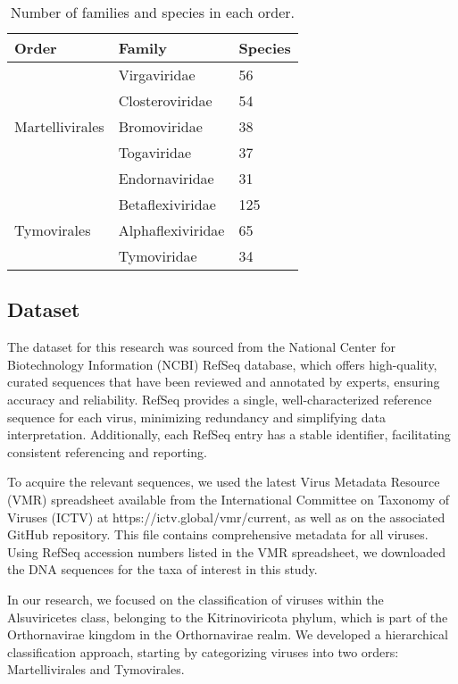 \begin{table}[tb]
\centering
\begin{tabular}{| l | l | l |}
\hline
\textbf{Order} & \textbf{Family} & \textbf{Species} \\
\hline
\multirow{5}{*}{Martellivirales} & Virgaviridae & 56 \\
                                  & Closteroviridae & 54 \\
                                  & Bromoviridae & 38 \\
                                  & Togaviridae & 37 \\
                                  & Endornaviridae & 31 \\
\hline
\multirow{3}{*}{Tymovirales}     & Betaflexiviridae & 125 \\
                                  & Alphaflexiviridae & 65 \\
                                  & Tymoviridae & 34 \\
\hline
\end{tabular}
\caption{Number of families and species in each order.}
\label{table:species:counts}
\end{table}


\subsection{Dataset}
\label{sec:obj:det}

The dataset for this research was sourced from the National Center for Biotechnology Information (NCBI) RefSeq database, which offers high-quality, curated sequences that have been reviewed and annotated by experts, ensuring accuracy and reliability. RefSeq provides a single, well-characterized reference sequence for each virus, minimizing redundancy and simplifying data interpretation. Additionally, each RefSeq entry has a stable identifier, facilitating consistent referencing and reporting.

To acquire the relevant sequences, we used the latest Virus Metadata Resource (VMR) spreadsheet available from the International Committee on Taxonomy of Viruses (ICTV) at https://ictv.global/vmr/current, as well as on the associated GitHub repository. This file contains comprehensive metadata for all viruses. Using RefSeq accession numbers listed in the VMR spreadsheet, we downloaded the DNA sequences for the taxa of interest in this study.

In our research, we focused on the classification of viruses within the Alsuviricetes class, belonging to the Kitrinoviricota phylum, which is part of the Orthornavirae kingdom in the Orthornavirae realm. We developed a hierarchical classification approach, starting by categorizing viruses into two orders: Martellivirales and Tymovirales.

